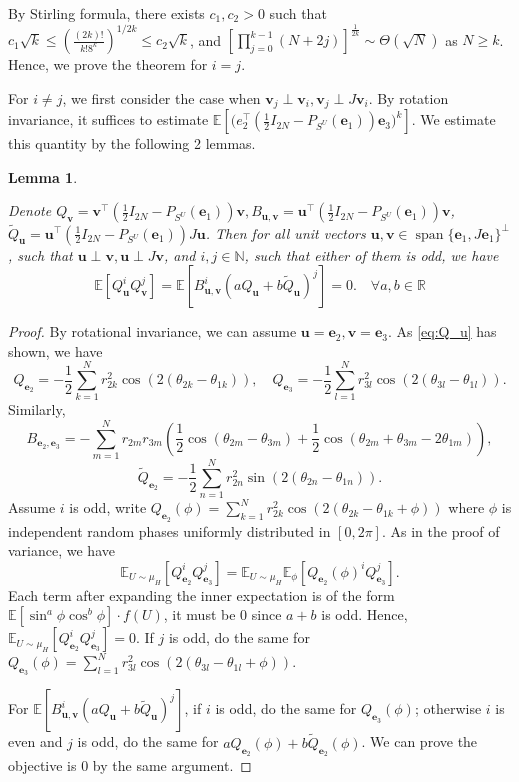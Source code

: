 \documentclass{amsart}
\theoremstyle{plain}
\newtheorem{lemma}{Lemma}
\theoremstyle{definition}
\theoremstyle{remark}
\newcommand{\EE}{\mathbb{E}}
\begin{document}
By Stirling formula, there exists $c_1,c_2>0$ such that $c_1\sqrt k\leq (\frac{(2k)!}{k!8^k})^{1/2k}\leq c_2\sqrt k$, and  $\left[\prod_{j=0}^{k-1}(N+2j)\right]^{\frac{1}{2k}}\sim\Theta (\sqrt{N})$ as $N\geq k$. Hence, we prove the theorem for $i=j$. 

For $i\neq j$, we first consider the case when $\bm v_j\perp\bm v_i,\bm v_j\perp J\bm v_i$. By rotation invariance, it suffices to estimate $\EE[\bm (e_2^\top(\frac{1}{2}I_{2N}-P_{S^U}(\bm e_1))\bm e_3)^k]$. We estimate this quantity by the following 2 lemmas.

\begin{lemma}
\label{lem:Q,B}

    Denote $Q_{\bm v}=\bm v^\top(\frac{1}{2}I_{2N}-P_{S^U}(\bm e_1))\bm v, B_{\bm u,\bm v}=\bm u^\top(\frac{1}{2}I_{2N}-P_{S^U}(\bm e_1))\bm v $, $\tilde Q_{\bm u}=\bm u^\top(\frac{1}{2}I_{2N}-P_{S^U}(\bm e_1))J\bm u$. Then for all unit vectors  $\bm u,\bm v\in\operatorname{span}\{\bm e_1,J\bm e_1\}^\perp$, such that $\bm u\perp \bm v,\bm u\perp J\bm v$, and $i,j\in \mathbb N$, such that either of them is odd, we have
    \begin{equation}
       \EE[Q_{\bm u}^iQ_{\bm v}^j]=\EE[B^i_{\bm u,\bm v}(aQ_{\bm u}+b\tilde Q_{\bm u})^j]=0.\quad \forall a,b\in\mathbb R 
    \end{equation}
\end{lemma}
\begin{proof}
    By rotational invariance, we can assume $\bm u=\bm e_2,\bm v=\bm e_3$. As \eqref{eq:Q_u} has shown, we have
    \[   Q_{\bm e_2}=-\frac{1}{2}\sum\limits_{k=1}^{N}r_{2k}^2\cos(2(\theta_{2k}-\theta_{1k})),\quad Q_{\bm e_3}=-\frac{1}{2}\sum\limits_{l=1}^{N}r_{3l}^2\cos(2(\theta_{3l}-\theta_{1l})). \]
    Similarly, 
    \[B_{\bm e_2,\bm e_3}=-\sum\limits_{m=1}^{N}r_{2m}r_{3m}\left(\frac{1}{2}\cos(\theta_{2m}-\theta_{3m})+\frac{1}{2}\cos(\theta_{2m}+\theta_{3m}-2\theta_{1m})\right),\]
\[\tilde  Q_{\bm e_2}=-\frac{1}{2}\sum\limits_{n=1}^{N}r_{2n}^2\sin(2(\theta_{2n}-\theta_{1n})).\]
    Assume $i$ is odd, write $Q_{\bm e_2}(\phi)=\sum\limits_{k=1}^{N}r_{2k}^2\cos(2(\theta_{2k}-\theta_{1k}+\phi))$ where $\phi$ is independent random phases uniformly distributed in $[0,2\pi]$. As in the proof of variance, we have 
\[\EE_{U\sim\mu_H}[Q_{\bm e_2}^iQ_{\bm e_3}^j]=\EE_{U\sim\mu_H}\EE_{\phi}[Q_{\bm e_2}(\phi)^iQ_{\bm e_3}^j].\]
Each term after expanding the inner expectation is of the form $\EE[\sin^a \phi \cos ^b\phi] \cdot f(U) $, it must be 0 since $a+b$ is odd. Hence, $\EE_{U\sim\mu_H}[Q_{\bm e_2}^iQ_{\bm e_3}^j]=0$. If $j$ is odd, do the same for $Q_{\bm e_3}(\phi)=\sum\limits_{l=1}^{N}r_{3l}^2\cos(2(\theta_{3l}-\theta_{1l}+\phi))$.

For $\EE[B^i_{\bm u,\bm v}(aQ_{\bm u}+b\tilde Q_{\bm u})^j]$, if $i$ is odd, do the same for $Q_{\bm e_3}(\phi)$; otherwise $i$ is even and $j$ is odd, do the same for $aQ_{\bm e_2}(\phi)+b\tilde Q_{\bm e_2}(\phi)$. We can prove the objective is 0 by the same argument.
\end{proof}
\end{document}
